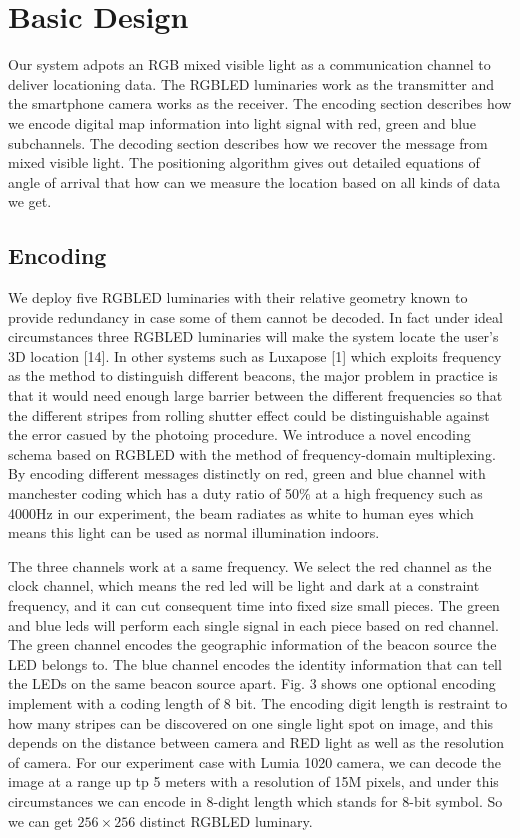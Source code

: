 \documentclass[conference]{IEEEtran}
\begin{document}
\section{\textbf{Basic Design}}
Our system adpots an RGB mixed visible light as a communication channel to deliver locationing data. The RGBLED luminaries work as the transmitter and the smartphone camera works as the receiver. The encoding section describes how we encode digital map information into light signal with red, green and blue subchannels. The decoding section describes how we recover the message from mixed visible light. The positioning algorithm gives out detailed equations of angle of arrival that how can we measure the location based on all kinds of data we get.

\subsection{\textbf{Encoding}}
We deploy five RGBLED luminaries with their relative geometry known to provide redundancy in case some of them cannot be decoded. In fact under ideal circumstances three RGBLED luminaries will make the system locate the user's 3D location [14]. In other systems such as Luxapose [1] which exploits frequency as the method to distinguish different beacons, the major problem in practice is that it would need enough large barrier between the different frequencies so that the different stripes from rolling shutter effect could be distinguishable against the error casued by the photoing procedure. 
We introduce a novel encoding schema based on RGBLED with the method of frequency-domain multiplexing. By encoding different messages distinctly on red, green and blue channel with manchester coding which has a duty ratio of 50\% at a high frequency such as 4000Hz in our experiment, the beam radiates as white to human eyes which means this light can be used as normal illumination indoors.

The three channels work at a same frequency. We select the red channel as the clock channel, which means the red led will be light and dark at a constraint frequency, and it can cut consequent time into fixed size small pieces. The green and blue leds will perform each single signal in each piece based on red channel. The green channel encodes the geographic information of the beacon source the LED belongs to. The blue channel encodes the identity information that can tell the LEDs on the same beacon source apart. Fig. 3 shows one optional encoding implement with a coding length of 8 bit. The encoding digit length is restraint to how many stripes can be discovered on one single light spot on image, and this depends on the distance between camera and RED light as well as the resolution of camera. For our experiment case with Lumia 1020 camera, we can decode the image at a range up tp 5 meters with a resolution of 15M pixels, and under this circumstances we can encode in 8-dight length which stands for 8-bit symbol. So we can get $256 \times 256$ distinct RGBLED luminary. 
\end{document}
